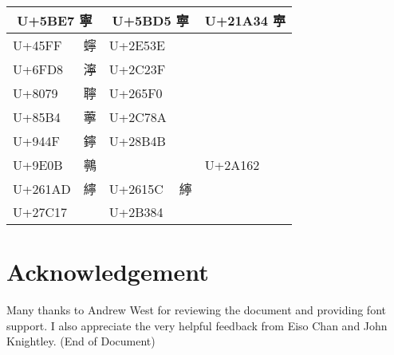 \documentclass[12pt]{article}
\begin{document}
\begin{table}[H]
    \begin{tabularx}{\textwidth}{|X|X|X|X|X|X|}
        \hline
        \multicolumn{2}{|c|}{U+5BE7 寧} & \multicolumn{2}{c|}{U+5BD5 寕} & \multicolumn{2}{c|}{U+21A34 𡨴} \\
        \hline
        U+45FF & 䗿 & U+2E53E & 𮔾 & & \\
        U+6FD8 & 濘 & U+2C23F & 𬈿 & & \\
        U+8079 & 聹 & U+265F0 & 𦗰 & & \\
        U+85B4 & 薴 & U+2C78A & 𬞊 & & \\
        U+944F & 鑏 & U+28B4B & 𨭋 & & \\
        U+9E0B & 鸋 & & & U+2A162 & 𪅢 \\
        U+261AD & 𦆭 & U+2615C & 𦅜 & & \\
        U+27C17 & 𧰗 & U+2B384 & 𫎄 & & \\
        \hline
    \end{tabularx}
\end{table}

\section*{Acknowledgement}
Many thanks to Andrew West for reviewing the document and providing font support. I also appreciate the very helpful feedback from Eiso Chan and John Knightley.
\vfill
(End of Document)
\end{document}
